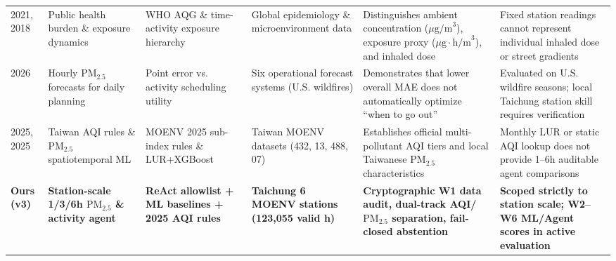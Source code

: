 \begin{table}[!t]
\begin{tabular}{L{1.4cm}L{2.4cm}L{2.6cm}L{2.5cm}L{4.0cm}L{3.7cm}}
\cite{who2021} 2021, \cite{steinle2018} 2018 & Public health burden \& exposure dynamics & WHO AQG \& time-activity exposure hierarchy & Global epidemiology \& microenvironment data & Distinguishes ambient concentration ($\mu\text{g/m}^3$), exposure proxy ($\mu\text{g}\cdot\text{h/m}^3$), and inhaled dose & Fixed station readings cannot represent individual inhaled dose or street gradients \\
\cite{berlinghieri2026} 2026 & Hourly $\text{PM}_{2.5}$ forecasts for daily planning & Point error vs. activity scheduling utility & Six operational forecast systems (U.S. wildfires) & Demonstrates that lower overall MAE does not automatically optimize ``when to go out'' & Evaluated on U.S. wildfire seasons; local Taichung station skill requires verification \\
\cite{moenv2025aqi} 2025, \cite{lo2025} 2025 & Taiwan AQI rules \& $\text{PM}_{2.5}$ spatiotemporal ML & MOENV 2025 sub-index rules \& LUR+XGBoost & Taiwan MOENV datasets (432, 13, 488, 07) & Establishes official multi-pollutant AQI tiers and local Taiwanese $\text{PM}_{2.5}$ characteristics & Monthly LUR or static AQI lookup does not provide 1--6h auditable agent comparisons \\
\textbf{Ours (v3)} & \textbf{Station-scale 1/3/6h $\text{PM}_{2.5}$ \& activity agent} & \textbf{ReAct allowlist + ML baselines + 2025 AQI rules} & \textbf{Taichung 6 MOENV stations (123,055 valid h)} & \textbf{Cryptographic W1 data audit, dual-track AQI/$\text{PM}_{2.5}$ separation, fail-closed abstention} & \textbf{Scoped strictly to station scale; W2--W6 ML/Agent scores in active evaluation} \\
\bottomrule
\end{tabular}
\end{table}

